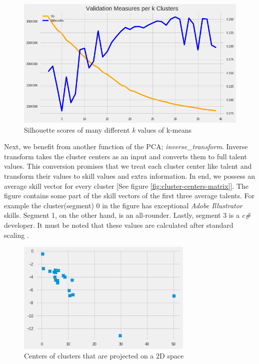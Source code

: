 \begin{figure}[htp]
	\centering
	\includegraphics[width=\textwidth]{figures/PCASilhouette.png}
	\caption{Silhouette scores of many different \textit{k} values of k-means}
	\label{fig:pca-silhouette}
\end{figure}


Next, we benefit from another function of the PCA; \textit{inverse\_transform}. Inverse transform takes the cluster centers as an input and converts them to full talent values. This conversion promises that we treat each cluster center like talent and transform their values to skill values and extra information. In end, we possess an average skill vector for every cluster [See figure \ref{fig:cluster-centers-matrix}]. The figure contains some part of the skill vectors of the first three average talents. For example the cluster(segment) 0 in the figure has exceptional \textit{Adobe Illustrator} skills. Segment 1, on the other hand, is an all-rounder. Lastly, segment 3 is a \textit{c\#} developer.  It must be noted that these values are calculated after standard scaling \cite{grus2019data}.

\begin{figure}[htp]
	\centering
	\includegraphics[width=0.75\textwidth]{figures/KMeansCenters.png}
	\caption{Centers of clusters that are projected on a 2D space}
	\label{fig:kmeans-centers}
\end{figure}


